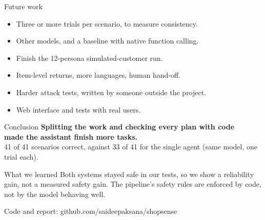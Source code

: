 \documentclass[aspectratio=169,12pt]{beamer}
\begin{document}
\begin{frame}{Future work}
\begin{itemize}\setlength{\itemsep}{5pt}
  \item Three or more trials per scenario, to measure consistency.
  \item Other models, and a baseline with native function calling.
  \item Finish the 12-persona simulated-customer run.
  \item Item-level returns, more languages, human hand-off.
  \item Harder attack tests, written by someone outside the project.
  \item Web interface and tests with real users.
\end{itemize}
\end{frame}

\begin{frame}{Conclusion}
\centering
{\Large\bfseries\color{accent} Splitting the work and checking every plan with code\\made the assistant finish more tasks.}\\[6mm]
{\large 41 of 41 scenarios correct, against 33 of 41 for the single agent (same model, one trial each).}\\[4mm]
\begin{block}{What we learned}
Both systems stayed safe in our tests, so we show a reliability gain, not a measured safety gain. The pipeline's safety rules are enforced by code, not by the model behaving well.
\end{block}
\vspace{1mm}
\small Code and report: github.com/saideepaksana/shopsense
\end{frame}
\end{document}

